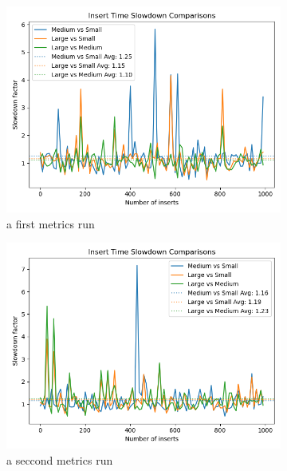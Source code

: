 \begin{figure}[H]
\centering
\begin{subfigure}[b]{0.48\textwidth}
    \centering
    \includegraphics[width=\textwidth]{./images/Profiler-insert-slowdown-01.png}
    \caption{a first metrics run}
    \label{fig:insertVsSize01}
\end{subfigure}
\hfill
\begin{subfigure}[b]{0.48\textwidth}
    \centering
    \includegraphics[width=\textwidth]{./images/Profiler-insert-slowdown-02.png}
    \caption{a seccond metrics run}
    \label{fig:insertVsSize02}
\end{subfigure}
\caption{ }
\end{figure}

